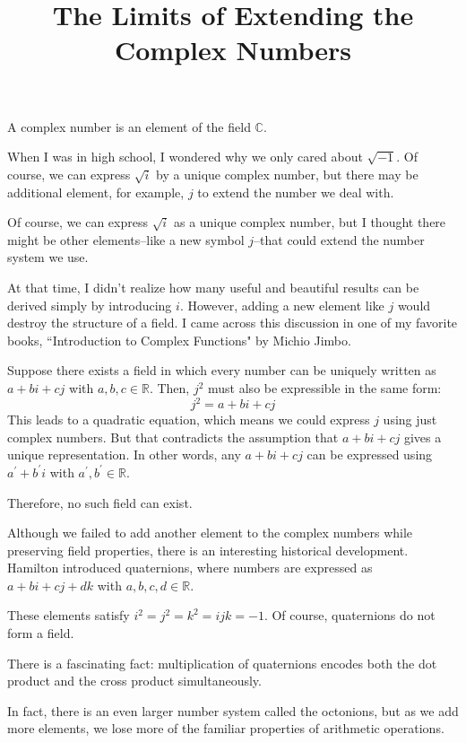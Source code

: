 \documentclass[letterpaper, 12pt]{article}
\title{The Limits of Extending the Complex Numbers}
\date{}
\theoremstyle{custom}
\begin{document}
\maketitle
A complex number is an element of the field $\mathbb{C}$.

When I was in high school, I wondered why we only cared about  $\sqrt{-1}$.
Of course, we can express $\sqrt{i}$ by a unique complex number, 
but there may be additional element, for example, $j$ to extend the number we deal with.

Of course, we can express $\sqrt{i}$ as a unique complex number,
but I thought there might be other elements--like a new symbol 
$j$--that could extend the number system we use.


At that time, I didn't realize how many useful and beautiful results can be derived simply by introducing $i$.
However, adding a new element like $j$ would destroy the structure of a field.
I came across this discussion in one of my favorite books, ``Introduction to Complex Functions" by Michio Jimbo.

Suppose there exists a field in which every number can be uniquely written as $a+bi+cj$ with $a,b,c \in \mathbb{R}$.
Then, $j^2$ must also be expressible in the same form:
\begin{equation*}
  j^2 = a + bi + cj
\end{equation*}
This leads to a quadratic equation, which means we could express $j$ using just complex numbers.
But that contradicts the assumption that $a+bi+cj$ gives a unique representation.
In other words, any $a+bi+cj$ can be expressed using $a^\prime + b^\prime i$ with $a^\prime, b^\prime \in \mathbb{R}$.

Therefore, no such field can exist.

Although we failed to add another element to the complex numbers while preserving field properties, there is an interesting historical development.
Hamilton introduced quaternions, where numbers are expressed as $a+bi+cj+dk$ with $a,b,c,d \in \mathbb{R}$.

These elements satisfy $i^2 = j^2 = k^2 = ijk = -1$.
Of course, quaternions do not form a field.

There is a fascinating fact: multiplication of quaternions encodes both the dot product and the cross product simultaneously.

In fact, there is an even larger number system called the octonions,
but as we add more elements, we lose more of the familiar properties of arithmetic operations.
\end{document}

